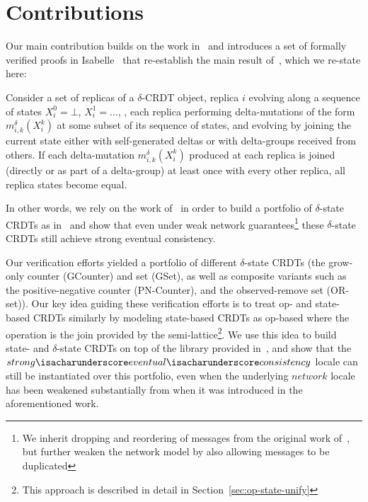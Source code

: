 \section{Contributions}

Our main contribution builds on the work in~\citep{gomes17} and introduces a set
of formally verified proofs in Isabelle~\citep{wenzel02} that re-establish the
main result of~\citep{almedia18}, which we re-state here:

\begin{theorem}
  Consider a set of replicas of a $\delta$-CRDT object, replica $i$ evolving
  along a sequence of states $X_i^0 = \bot$, $X_i^1=\ldots$, , each replica
  performing delta-mutations of the form $m^\delta_{i,k}(X^k_i)$ at some subset
  of its sequence of states, and evolving by joining the current state either
  with self-generated deltas or with delta-groups received from others. If each
  delta-mutation $m^\delta _{i,k}(X^k_i)$ produced at each replica is joined
  (directly or as part of a delta-group) at least once with every other replica,
  all replica states become equal.
\end{theorem}

In other words, we rely on the work of~\citep{gomes17} in order to build a
portfolio of $\delta$-state CRDTs as in~\citep{almedia18} and show that even
under weak network guarantees\footnote{We inherit dropping and reordering of
messages from the original work of~\citep{gomes17}, but further weaken the
network model by also allowing messages to be duplicated} these $\delta$-state
CRDTs still achieve strong eventual consistency.

Our verification efforts yielded a portfolio of different $\delta$-state CRDTs
(the grow-only counter (GCounter) and set (GSet), as well as composite variants
such as the positive-negative counter (PN-Counter), and the observed-remove set
(OR-set)). Our key idea guiding these verification efforts is to treat op- and
state-based CRDTs similarly by modeling state-based CRDTs as op-based where the
operation is the join provided by the semi-lattice\footnote{This approach is
described in detail in Section~\ref{sec:op-state-unify}}. We use this idea to
build state- and $\delta$-state CRDTs on top of the library provided
in~\citep{gomes17}, and show that the
$strong{\isacharunderscore}eventual{\isacharunderscore}consistency$ locale can
still be instantiated over this portfolio, even when the underlying $network$
locale has been weakened substantially from when it was introduced in the
aforementioned work.


